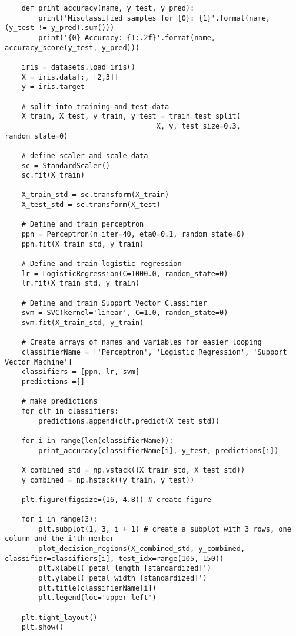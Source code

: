 \documentclass[12pt]{article}
\begin{document}
\begin{verbatim}
    def print_accuracy(name, y_test, y_pred):
        print('Misclassified samples for {0}: {1}'.format(name, (y_test != y_pred).sum()))
        print('{0} Accuracy: {1:.2f}'.format(name, accuracy_score(y_test, y_pred)))
    
    iris = datasets.load_iris()
    X = iris.data[:, [2,3]]
    y = iris.target
    
    # split into training and test data
    X_train, X_test, y_train, y_test = train_test_split(
                                    X, y, test_size=0.3, random_state=0)
    
    # define scaler and scale data
    sc = StandardScaler()
    sc.fit(X_train)
    
    X_train_std = sc.transform(X_train)
    X_test_std = sc.transform(X_test)
    
    # Define and train perceptron
    ppn = Perceptron(n_iter=40, eta0=0.1, random_state=0)
    ppn.fit(X_train_std, y_train)
    
    # Define and train logistic regression
    lr = LogisticRegression(C=1000.0, random_state=0)
    lr.fit(X_train_std, y_train)
    
    # Define and train Support Vector Classifier
    svm = SVC(kernel='linear', C=1.0, random_state=0)
    svm.fit(X_train_std, y_train)
    
    # Create arrays of names and variables for easier looping
    classifierName = ['Perceptron', 'Logistic Regression', 'Support Vector Machine']
    classifiers = [ppn, lr, svm]
    predictions =[]
    
    # make predictions 
    for clf in classifiers:
        predictions.append(clf.predict(X_test_std))
    
    for i in range(len(classifierName)):
        print_accuracy(classifierName[i], y_test, predictions[i])
    
    X_combined_std = np.vstack((X_train_std, X_test_std))
    y_combined = np.hstack((y_train, y_test))
    
    plt.figure(figsize=(16, 4.8)) # create figure
    
    for i in range(3):
        plt.subplot(1, 3, i + 1) # create a subplot with 3 rows, one column and the i'th member
        plot_decision_regions(X_combined_std, y_combined, classifier=classifiers[i], test_idx=range(105, 150))
        plt.xlabel('petal length [standardized]') 
        plt.ylabel('petal width [standardized]') 
        plt.title(classifierName[i])
        plt.legend(loc='upper left')
    
    plt.tight_layout()    
    plt.show()
\end{verbatim}
\end{document}
